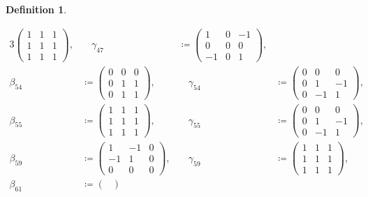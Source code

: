 \documentclass{amsart}
\theoremstyle{definition}
\newtheorem{Def}{Definition}[section]
\theoremstyle{plain}
\begin{document}
\begin{Def}
\begin{itemize}
{\begin{alignat*}{3}
        \begin{pmatrix}
            1 & 1 & 1\\
            1 & 1 & 1\\
            1 & 1 & 1
        \end{pmatrix}, &\quad \gamma_{47} &\coloneqq
        \begin{pmatrix}
            1 & 0 & -1\\
            0 & 0 & 0\\
            -1 & 0 & 1
        \end{pmatrix},\\
    \beta_{54} &\coloneqq
        \begin{pmatrix}
            0 & 0 & 0\\
            0 & 1 & 1\\
            0 & 1 & 1
        \end{pmatrix}, &\quad \gamma_{54} &\coloneqq
        \begin{pmatrix}
            0 & 0 & 0\\
            0 & 1 & -1\\
            0 & -1 & 1
        \end{pmatrix},\\
    \beta_{55} &\coloneqq
        \begin{pmatrix}
            1 & 1 & 1\\
            1 & 1 & 1\\
            1 & 1 & 1
        \end{pmatrix}, &\quad \gamma_{55} &\coloneqq
        \begin{pmatrix}
            0 & 0 & 0\\
            0 & 1 & -1\\
            0 & -1 & 1
        \end{pmatrix},\\
    \beta_{59} &\coloneqq
        \begin{pmatrix}
            1 & -1 & 0\\
            -1 & 1 & 0\\
            0 & 0 & 0
        \end{pmatrix}, &\quad \gamma_{59} &\coloneqq
    \begin{pmatrix}
        1 & 1 & 1\\
        1 & 1 & 1\\
        1 & 1 & 1
    \end{pmatrix},\\
    \beta_{61} &\coloneqq
        \begin{pmatrix}

\end{pmatrix}
\end{alignat*}}
\end{itemize}
\end{Def}
\end{document}
